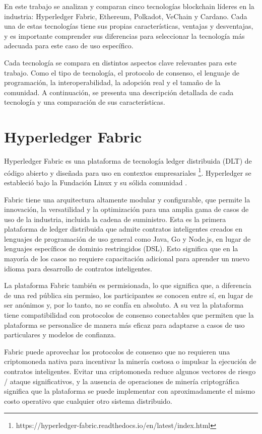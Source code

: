 \documentclass[main.tex]{subfiles}
\begin{document}
En este trabajo se analizan y comparan cinco tecnologías blockchain líderes en la industria: Hyperledger Fabric, Ethereum, Polkadot, VeChain y Cardano. Cada una de estas tecnologías tiene sus propias características, ventajas y desventajas, y es importante comprender sus diferencias para seleccionar la tecnología más adecuada para este caso de uso específico.

Cada tecnología se compara en distintos aspectos clave relevantes para este trabajo. Como el tipo de tecnología, el protocolo de consenso, el lenguaje de programación, la interoperabilidad, la adopción real y el tamaño de la comunidad. A continuación, se presenta una descripción detallada de cada tecnología y una comparación de sus características.

\section{Hyperledger Fabric}

Hyperledger Fabric es una plataforma de tecnología ledger distribuida (DLT) de código abierto y diseñada para uso en contextos empresariales \footnote{https://hyperledger-fabric.readthedocs.io/en/latest/index.html}. Hyperledger se estableció bajo la Fundación Linux y su sólida comunidad \cite{androulaki2018hyperledger}. 

Fabric tiene una arquitectura altamente modular y configurable, que permite la innovación, la versatilidad y la optimización para una amplia gama de casos de uso de la industria, incluida la cadena de suministro. Esta es la primera plataforma de ledger distribuida que admite contratos inteligentes creados en lenguajes de programación de uso general como Java, Go y Node.js, en lugar de lenguajes específicos de dominio restringidos (DSL). Esto significa que en la mayoría de los casos no requiere capacitación adicional para aprender un nuevo idioma para desarrollo de contratos inteligentes.

La plataforma Fabric también es permisionada, lo que significa que, a diferencia de una red pública sin permiso, los participantes se conocen entre sí, en lugar de ser anónimos y, por lo tanto, no se confía en absoluto. A su vez la plataforma tiene compatibilidad con protocolos de consenso conectables que permiten que la plataforma se personalice de manera más eficaz para adaptarse a casos de uso particulares y modelos de confianza. 

Fabric puede aprovechar los protocolos de consenso que no requieren una criptomoneda nativa para incentivar la minería costosa o impulsar la ejecución de contratos inteligentes. Evitar una criptomoneda reduce algunos vectores de riesgo / ataque significativos, y la ausencia de operaciones de minería criptográfica significa que la plataforma se puede implementar con aproximadamente el mismo costo operativo que cualquier otro sistema distribuido.
\end{document}
